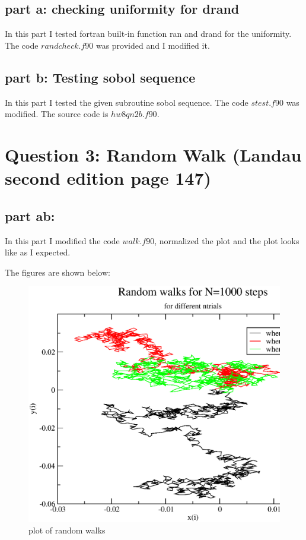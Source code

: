 \documentclass[11pt,a4paper,english]{article}
\begin{document}
   	
	\subsection{part a: checking uniformity for drand }
	
	In this part I tested fortran built-in function ran and drand for the uniformity.
	The code $randcheck.f90$ was provided and I modified it.
	
	\subsection{part b: Testing sobol sequence }
	
    In this part I tested the given subroutine sobol sequence.
    The code $stest.f90$ was modified. The source code is $hw8qn2b.f90$.
    
    
\section{Question 3: Random Walk (Landau second edition page 147) }

   	
	\subsection{part ab: }
	
	In this part I modified the code $walk.f90$, normalized the plot and the plot looks like as
	I expected.
	
	    The figures are shown below:\\
	\begin{figure}[h!]
	\centering
	\includegraphics [scale=0.6]{figures/hw8qn3ab.eps}
	\caption{plot of random walks }
	\end{figure}
	\clearpage
	
\end{document}
